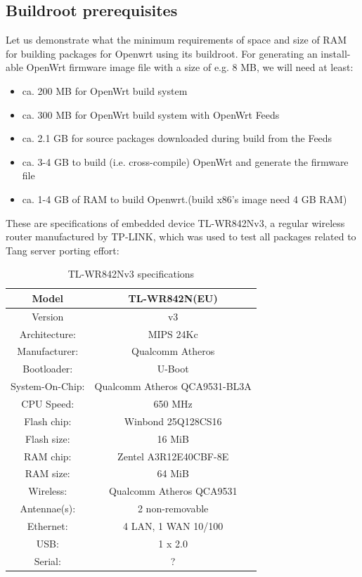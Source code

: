 \subsection{Buildroot prerequisites}

Let us demonstrate what the minimum requirements of space and size of RAM for building packages for Openwrt using its buildroot.
For generating an install-able OpenWrt firmware image file with a size of e.g. 8 MB, we will need at least:
\begin{itemize}
\item ca. 200 MB for OpenWrt build system
\item ca. 300 MB for OpenWrt build system with OpenWrt Feeds
\item ca. 2.1 GB for source packages downloaded during build from the Feeds
\item ca. 3-4 GB to build (i.e. cross-compile) OpenWrt and generate the firmware file
\item ca. 1-4 GB of RAM to build Openwrt.(build x86's image need 4 GB RAM)
\end{itemize}

These are specifications of embedded device TL-WR842Nv3, a regular wireless router manufactured by TP-LINK, which was used to test all packages related to Tang server porting effort:

\begin{table}[h]
\centering
\label{routerspec}
\begin{tabular}{c|c}
\hline
Model           &   TL-WR842N(EU)                   \\ \hline
Version         &   v3                              \\ \hline
Architecture:   &   MIPS 24Kc                       \\ \hline
Manufacturer:   &   Qualcomm Atheros                \\ \hline
Bootloader:     &   U-Boot                          \\ \hline
System-On-Chip: &   Qualcomm Atheros QCA9531-BL3A   \\ \hline
CPU Speed:      &   650 MHz                         \\ \hline
Flash chip:     &   Winbond 25Q128CS16              \\ \hline
Flash size:     &   16 MiB                          \\ \hline
RAM chip:       &   Zentel A3R12E40CBF-8E           \\ \hline
RAM size:       &   64 MiB                          \\ \hline
Wireless:       &   Qualcomm Atheros QCA9531        \\ \hline
Antennae(s):    &   2 non-removable                 \\ \hline
Ethernet:       &   4 LAN, 1 WAN 10/100             \\ \hline
USB:            &   1 x 2.0                         \\ \hline
Serial:         &   ?                               \\ \hline
\end{tabular}
\caption{TL-WR842Nv3 specifications}
\end{table}

